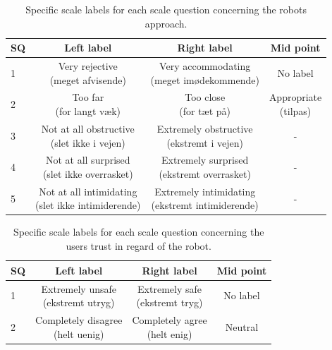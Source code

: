 \begin{table}[H]
	\centering
	\begin{tabular}{l|c|c|c}
		SQ     & Left label & Right label & Mid point \\\hline
		1   & \makecell{Very rejective \\(meget afvisende)} & \makecell{Very accommodating \\(meget imødekommende)} & No label          \\\hline
		2   & \makecell{Too far \\(for langt væk)} & \makecell{Too close \\(for tæt på)} & \makecell{Appropriate \\(tilpas)}         \\\hline
		3   & \makecell{Not at all obstructive \\(slet ikke i vejen)} & \makecell{Extremely obstructive \\(ekstremt i vejen)} & -         \\\hline
	 	4   & \makecell{Not at all surprised \\(slet ikke overrasket)} & \makecell{Extremely surprised \\(ekstremt overrasket)} & -         \\\hline
		5   & \makecell{Not at all intimidating \\(slet ikke intimiderende)} & \makecell{Extremely intimidating \\(ekstremt intimiderende)} & -           
	\end{tabular}
	\caption{Specific scale labels for each scale question concerning the robots approach.}
	\label{tab:ApproachScale}         
\end{table}
\noindent
%
%
\begin{table}[H]
	\centering
	\begin{tabular}{l|c|c|c}
		SQ  & Left label & Right label & Mid point \\\hline
		1   & \makecell{Extremely unsafe\\ (ekstremt utryg)} & \makecell{Extremely safe \\(ekstremt tryg)} & No label          \\\hline
		2   & \makecell{Completely disagree \\(helt uenig)} & \makecell{Completely agree \\(helt enig)} & Neutral 
	\end{tabular}
	\caption{Specific scale labels for each scale question concerning the users trust in regard of the robot.}
	\label{tab:TrustScale}         
\end{table}
